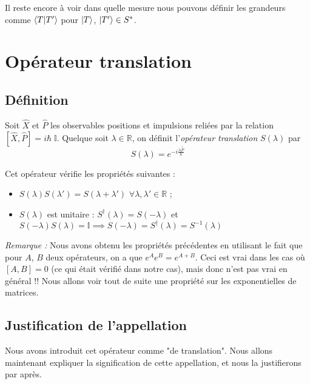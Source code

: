 \documentclass[../notesdecours]{subfiles}
\begin{document}
\begin{remark}
    Il reste encore à voir dans quelle mesure nous pouvons définir les grandeurs comme $\braket{T|T'}$ pour $\ket{T}$, $\ket{T'} \in S^*$. 
\end{remark}


\section{Opérateur translation}
\subsection{Définition}
Soit $\hat{X}$ et $\hat{P}$ les observables positions et impulsions reliées par la relation $[\hat{X}, \hat{P}] = i\hbar \; \mathbb{I}$. Quelque soit $\lambda \in \mathbb{R}$, on définit l'\emph{opérateur translation} $S(\lambda)$ par
\begin{equation}\label{eq:chap6-definition_operateur_translation}
    S(\lambda) = e^{-i\frac{\lambda \hat{P}}{\hbar}} 
\end{equation}

Cet opérateur vérifie les propriétés suivantes : 
\begin{itemize}[label = \textbullet]
    \item $S(\lambda) S(\lambda') = S(\lambda + \lambda')$  \; $\forall \lambda, \lambda' \in \mathbb{R}$ ; 
    \item $S(\lambda)$ est unitaire : $S^\dagger (\lambda) = S(-\lambda)$ et $S(-\lambda)S(\lambda) = \mathbb{I} \implies S(-\lambda) = S^\dagger(\lambda) = S^{-1}(\lambda)$
\end{itemize}

\textit{Remarque :} Nous avons obtenu les propriétés précédentes en utilisant le fait que pour $A$, $B$ deux opérateurs, on a que $e^A e^B = e^{A+B}$. Ceci est vrai dans les cas où $[A, B] = 0$ (ce qui était vérifié dans notre cas), mais donc n'est pas vrai en général !! Nous allons voir tout de suite une propriété sur les exponentielles de matrices. \\

\subsection{Justification de l'appellation}
Nous avons introduit cet opérateur comme "de translation". Nous allons maintenant expliquer la signification de cette appellation, et nous la justifierons par après.\\
\end{document}
